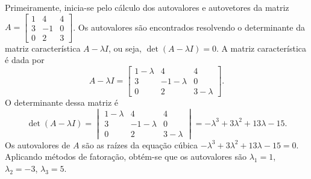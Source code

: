 \begin{resolution}
  Primeiramente, inicia-se pelo cálculo dos autovalores e autovetores da matriz \( A = \begin{bmatrix} 1 & 4 & 4 \\ 3 & -1 & 0 \\ 0 & 2 & 3 \end{bmatrix} \). Os autovalores são encontrados resolvendo o determinante da matriz característica \( A - \lambda I \), ou seja, \(\det(A - \lambda I) = 0\). A matriz característica é dada por
  \[
    A - \lambda I = \begin{bmatrix}
      1 - \lambda & 4            & 4           \\
      3           & -1 - \lambda & 0           \\
      0           & 2            & 3 - \lambda
    \end{bmatrix}.
  \]
  O determinante dessa matriz é
  \[
    \det(A - \lambda I) = \begin{vmatrix}
      1 - \lambda & 4            & 4           \\
      3           & -1 - \lambda & 0           \\
      0           & 2            & 3 - \lambda
    \end{vmatrix}
    = -\lambda^3+3\lambda^2+13\lambda-15.
  \]
  Os autovalores de \( A \) são as raízes da equação cúbica \(-\lambda^3+3\lambda^2+13\lambda-15=0\). Aplicando métodos de fatoração, obtém-se que os autovalores são \( \lambda_1 = 1 \), \( \lambda_2 = -3 \), \( \lambda_3 = 5 \).


\end{resolution}
